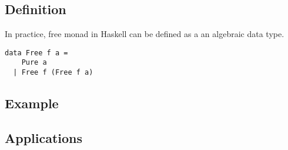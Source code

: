 \subsection{Definition}
In practice, free monad in Haskell can be defined as a an algebraic data type.
\begin{verbatim}
data Free f a =
    Pure a
  | Free f (Free f a)
\end{verbatim}
\subsection{Example}
    
\subsection{Applications} \label{b:fm:a}